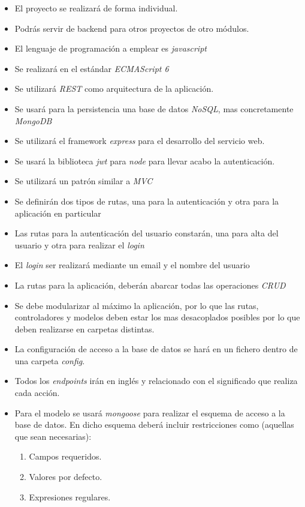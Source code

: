 \documentclass{article}
\begin{document}
\begin{itemize}
\item El proyecto se realizará de forma individual.
\item Podrás servir de backend para otros proyectos de otro módulos.
\item El lenguaje de programación a emplear es \emph{javascript}
\item Se realizará en el estándar \emph{ECMAScript 6}
\item Se utilizará \emph{REST} como arquitectura de la aplicación.
\item Se usará para la persistencia una base de datos \emph{NoSQL}, mas concretamente \emph{MongoDB}
\item Se utilizará el framework \emph{express} para el desarrollo del servicio web.
\item Se usará la biblioteca \emph{jwt} para \emph{node} para llevar acabo la autenticación.
\item Se utilizará un patrón similar a \emph{MVC}
\item Se definirán dos tipos de rutas, una para la autenticación y otra para la aplicación en particular
\item Las rutas para la autenticación del usuario constarán, una para alta del usuario y otra para realizar el \emph{login}
\item El \emph{login} ser realizará mediante un email y el nombre del usuario
\item La rutas para la aplicación, deberán abarcar todas las operaciones \emph{CRUD} 
\item Se debe modularizar al máximo la aplicación, por lo que las rutas, controladores y modelos deben estar los mas desacoplados posibles por lo que deben realizarse en carpetas distintas.
\item La configuración de acceso a  la base de datos se hará en un fichero dentro de una carpeta \emph{config}.
\item Todos los \emph{endpoints} irán en inglés y relacionado con el significado que realiza cada acción.
\item Para el modelo se usará \emph{mongoose} para realizar el esquema de acceso a la base de datos. En dicho esquema deberá incluir restricciones como (aquellas que sean necesarias):
\newpage
\begin{enumerate}
\item Campos requeridos.
\item Valores por defecto.
\item Expresiones regulares.

\end{enumerate}
\end{itemize}
\end{document}
